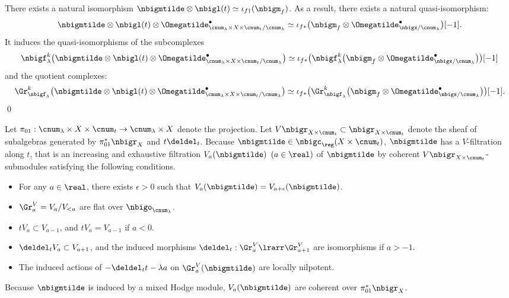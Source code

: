 \documentclass[a4,10pt]{article}
\begin{document}
\begin{lem}
There exists a natural isomorphism
$\nbigmtilde\otimes\nbigl(t)
 \simeq
 \iota_{f\dagger}(\nbigm_f)$. 
As a result,
there exists a natural quasi-isomorphism:
\[
 \nbigmtilde\otimes\nbigl(t)
 \otimes\Omegatilde^{\bullet}
 _{\cnum_{\lambda}\times X\times\cnum_t/\cnum_{\lambda}}
 \simeq
 \iota_{f\ast}\bigl(
 \nbigm_f\otimes\Omegatilde^{\bullet}_{\nbigx/\cnum_{\lambda}}
 \bigr)[-1].
\]
It induces the quasi-isomorphisms of the subcomplexes
\[
 \nbigf^k_{\lambda}\bigl(
 \nbigmtilde\otimes\nbigl(t)
 \otimes\Omegatilde^{\bullet}
 _{\cnum_{\lambda}\times X\times\cnum_t/\cnum_{\lambda}}
 \bigr)
 \simeq
 \iota_{f\ast}\bigl(
 \nbigf^k_{\lambda}\bigl(
 \nbigm_f\otimes\Omegatilde^{\bullet}_{\nbigx/\cnum_{\lambda}}
 \bigr)
 \bigr)[-1]
\]
and the quotient complexes:
\[
 \Gr^{k}_{\nbigf_{\lambda}}\bigl(
 \nbigmtilde\otimes\nbigl(t)
 \otimes\Omegatilde^{\bullet}
 _{\cnum_{\lambda}\times X\times\cnum_t/\cnum_{\lambda}}
 \bigr)
 \simeq
 \iota_{f\ast}\bigl(
 \Gr^k_{\nbigf_{\lambda}}\bigl(
 \nbigm_f\otimes\Omegatilde^{\bullet}_{\nbigx/\cnum_{\lambda}}
 \bigr)
 \bigr)[-1].
\] 
\hfill\qed
\end{lem}


Let $\pi_{01}:
\cnum_{\lambda}\times X\times\cnum_t\to \cnum_{\lambda}\times X$
denote the projection.
Let $V\nbigr_{X\times\cnum_t}\subset \nbigr_{X\times\cnum_t}$
denote
the sheaf of subalgebras
generated by
$\pi_{01}^{\ast}\nbigr_X$ and $t\deldel_t$.
Because
$\nbigmtilde\in\nbigc_{\reg}(X\times\cnum_t)$,
$\nbigmtilde$ has a $V$-filtration along $t$,
that is an increasing and exhaustive filtration
$V_{a}(\nbigmtilde)$ $(a\in\real)$ of $\nbigmtilde$
by coherent $V\nbigr_{X\times\cnum_t}$-submodules
satisfying the following conditions.
\begin{itemize}
 \item For any $a\in\real$,
       there exists $\epsilon>0$
       such that $V_a(\nbigmtilde)=V_{a+\epsilon}(\nbigmtilde)$.
 \item $\Gr^V_a=V_a/V_{<a}$
       are flat over $\nbigo_{\cnum_{\lambda}}$.
 \item $tV_a\subset V_{a-1}$,
       and $tV_a=V_{a-1}$ if $a<0$.
 \item $\deldel_t V_a\subset V_{a+1}$,
       and the induced morphisms
       $\deldel_t:\Gr^V_a\lrarr \Gr^V_{a+1}$
       are isomorphisms if $a>-1$.
 \item The induced actions of $-\deldel_tt-\lambda a$
       on $\Gr^V_a(\nbigmtilde)$
       are locally nilpotent.
\end{itemize}
Because $\nbigmtilde$ is induced by a mixed Hodge module,
$V_a(\nbigmtilde)$ are coherent over $\pi_{01}^{\ast}\nbigr_X$.
\end{document}
